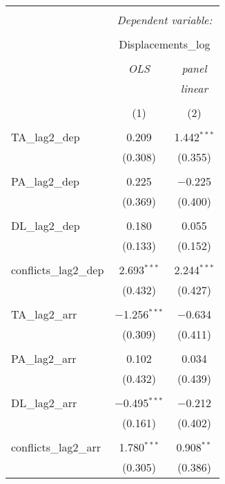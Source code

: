 
\begin{table}[!htbp] \centering 
  \caption{} 
  \label{} 
\begin{tabular}{@{\extracolsep{5pt}}lcc} 
\\[-1.8ex]\hline 
\hline \\[-1.8ex] 
 & \multicolumn{2}{c}{\textit{Dependent variable:}} \\ 
\cline{2-3} 
\\[-1.8ex] & \multicolumn{2}{c}{Displacements\_log} \\ 
\\[-1.8ex] & \textit{OLS} & \textit{panel} \\ 
 & \textit{} & \textit{linear} \\ 
\\[-1.8ex] & (1) & (2)\\ 
\hline \\[-1.8ex] 
 TA\_lag2\_dep & 0.209 & 1.442$^{***}$ \\ 
  & (0.308) & (0.355) \\ 
  & & \\ 
 PA\_lag2\_dep & 0.225 & $-$0.225 \\ 
  & (0.369) & (0.400) \\ 
  & & \\ 
 DL\_lag2\_dep & 0.180 & 0.055 \\ 
  & (0.133) & (0.152) \\ 
  & & \\ 
 conflicts\_lag2\_dep & 2.693$^{***}$ & 2.244$^{***}$ \\ 
  & (0.432) & (0.427) \\ 
  & & \\ 
 TA\_lag2\_arr & $-$1.256$^{***}$ & $-$0.634 \\ 
  & (0.309) & (0.411) \\ 
  & & \\ 
 PA\_lag2\_arr & 0.102 & 0.034 \\ 
  & (0.432) & (0.439) \\ 
  & & \\ 
 DL\_lag2\_arr & $-$0.495$^{***}$ & $-$0.212 \\ 
  & (0.161) & (0.402) \\ 
  & & \\ 
 conflicts\_lag2\_arr & 1.780$^{***}$ & 0.908$^{**}$ \\ 
  & (0.305) & (0.386) \\ 

\end{tabular}
\end{table}
